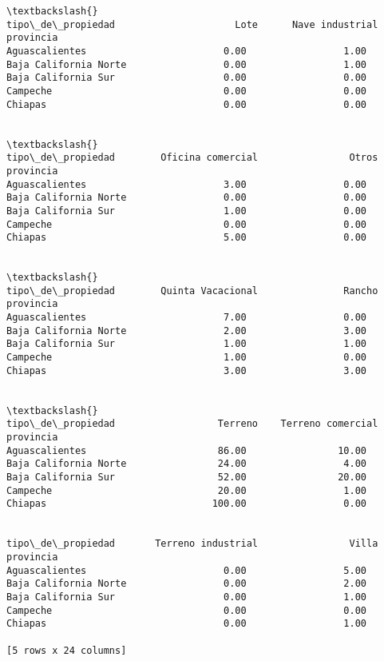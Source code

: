 \documentclass[11pt]{article}
\begin{document}
\begin{tcolorbox}[breakable, boxrule=.5pt, size=fbox, pad at break*=1mm, opacityfill=0]
\begin{Verbatim}[commandchars=\\\{\}]
                                                                 \textbackslash{}
tipo\_de\_propiedad                     Lote      Nave industrial
provincia
Aguascalientes                        0.00                 1.00
Baja California Norte                 0.00                 1.00
Baja California Sur                   0.00                 0.00
Campeche                              0.00                 0.00
Chiapas                               0.00                 0.00

                                                                 \textbackslash{}
tipo\_de\_propiedad        Oficina comercial                Otros
provincia
Aguascalientes                        3.00                 0.00
Baja California Norte                 0.00                 0.00
Baja California Sur                   1.00                 0.00
Campeche                              0.00                 0.00
Chiapas                               5.00                 0.00

                                                                 \textbackslash{}
tipo\_de\_propiedad        Quinta Vacacional               Rancho
provincia
Aguascalientes                        7.00                 0.00
Baja California Norte                 2.00                 3.00
Baja California Sur                   1.00                 1.00
Campeche                              1.00                 0.00
Chiapas                               3.00                 3.00

                                                                 \textbackslash{}
tipo\_de\_propiedad                  Terreno    Terreno comercial
provincia
Aguascalientes                       86.00                10.00
Baja California Norte                24.00                 4.00
Baja California Sur                  52.00                20.00
Campeche                             20.00                 1.00
Chiapas                             100.00                 0.00


tipo\_de\_propiedad       Terreno industrial                Villa
provincia
Aguascalientes                        0.00                 5.00
Baja California Norte                 0.00                 2.00
Baja California Sur                   0.00                 1.00
Campeche                              0.00                 0.00
Chiapas                               0.00                 1.00

[5 rows x 24 columns]
\end{Verbatim}
\end{tcolorbox}
        
\end{document}
